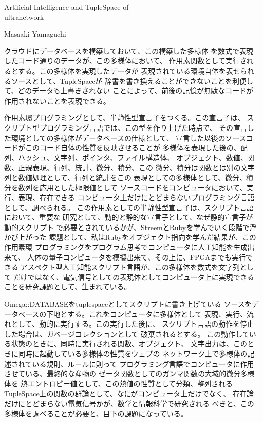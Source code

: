 \documentclass{jsarticle}
\begin{document}
{\newpage
\begin{center}
\large	Artificial Intelligence and TupleSpace of \\
         ultranetwork
\end{center}
\begin{center}
	Masaaki Yamaguchi
\end{center}




  クラウドにデータベースを構築しておいて、この構築した多様体
  を数式で表現したコード通りのデータが、この多様体において、
  作用素関数として実行されるとする。この多様体を実現したデータが
  表現されている環境自体を表せられるソースとして、TupleSpaceが
  辞書を書き換えることができないことを利便して、どのデータも上書きされない
  ことによって、前後の記憶が無駄なコードが作用されないことを表現できる。

  作用素環プログラミングとして、半静性型宣言子をつくる。この宣言子は、
  スクリプト型プログラミング言語では、この型を作り上げた時点で、
  その宣言した環境としての多様体がデータベースの仕様として、
  宣言した以後のソースコードがこのコード自体の性質を反映させることが
  多様体を表現した後の、配列、ハッシュ、文字列、ポインタ、ファイル構造体、
  オブジェクト、数値、関数、正規表現、行列、統計、微分、積分、この
  微分、積分は関数とは別の文字列と数値処理として、行列と統計をこの
  表現としての多様体として、微分、積分を数列を応用とした極限値として
  ソースコードをコンピュータにおいて、実行、表現、存在できる
  コンピュータ上だけにとどまらないプログラミング言語として、調べられる。
  この作用素としての半静性型宣言子は、スクリプト言語において、重要な
  研究として、動的と静的な宣言子として、なぜ静的宣言子が動的スクリプト
  で必要とされているかが、StreemとRubyを学んでいく段階で浮かび上がった
  課題として、私はRubyをオブジェクト指向を学んだ結果が、この作用素環
  プログラミングをプログラム思考でコンピュータに人工知能を生成出来て、
  人体の量子コンピュータを模擬出来て、その上に、FPGAまでも実行できる
  アスペクト型人工知能スクリプト言語が、この多様体を数式を文字列として
  だけではなく、電気信号としての表現体としてコンピュータ上に実現できる
  ことを研究課題として、生まれている。


  Omega::DATABASEをtuplespaceとしてスクリプトに書き上げている
  ソースをデータベースの下地とする。これをコンピュータに多様体として
  表現、実行、流れとして、動的に実行する。この実行した後に、
  スクリプト言語の動作を停止した場合は、ガベージコレクションとして
  破棄されるとする。
  この動作している状態のときに、同時に実行される関数、オブジェクト、
  文字出力は、このときに同時に起動している多様体の性質をウェブの
  ネットワーク上で多様体の記述されている規則、ルールに則って
  プログラミング言語でコンピュータに作用させている、最終的な産物の
  ゼータ関数としてのガンマ関数の大域的微分多様体を
  熱エントロピー値として、この熱値の性質として分類、整列される
  TupleSpace上の関数の群論として、なにがコンピュータ上だけでなく、
  存在論だけにとどまらない電気信号かが、数学と情報科学で研究される
  べきと、この多様体を調べることが必要と、目下の課題になっている。

}
\end{document}
